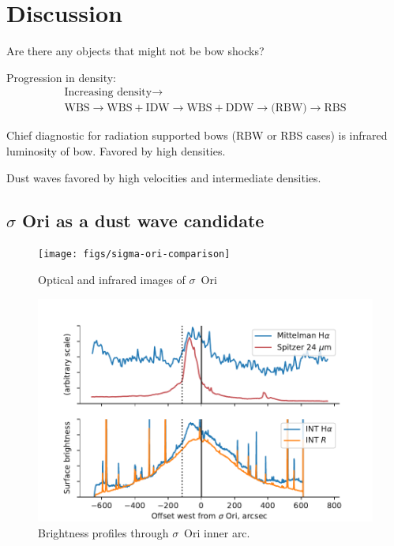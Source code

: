 \section{Discussion}
\label{sec:summary-discussion}

Are there any objects that might not be bow shocks?

Progression in density:
\begin{gather*}
  \text{Increasing density} \longrightarrow \\
  \text{WBS} \to \text{WBS} + \text{IDW} \to \text{WBS} + \text{DDW} \to \text{(RBW)} \to \text{RBS}
\end{gather*}

Chief diagnostic for radiation supported bows (RBW or RBS cases) is
infrared luminosity of bow.  Favored by high densities.

Dust waves favored by high velocities and intermediate densities.


\subsection{$\sigma$ Ori as a dust wave candidate}
\label{sec:sigma-ori-as}

\begin{figure}
  \centering
  \texttt{[image: figs/sigma-ori-comparison]}
  \caption{Optical and infrared images of $\sigma$~Ori}
  \label{fig:sig-ori}
\end{figure}

\begin{figure}
  \centering
  \includegraphics[width=\linewidth]{figs/sigma-ori-eastwest-cuts}
  \caption{Brightness profiles through $\sigma$~Ori inner arc.}
  \label{fig:sig-ori-cuts}
\end{figure}





